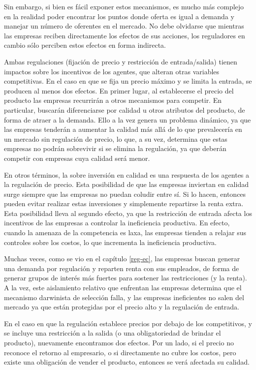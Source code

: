 \documentclass[
  12pt,
  spanish,
]{book}
\begin{document}
Sin embargo, si bien es fácil exponer estos mecanismos, es mucho más complejo en la realidad poder encontrar los puntos donde oferta es igual a demanda y manejar un número de oferentes en el mercado. No debe olvidarse que mientras las empresas reciben directamente los efectos de sus acciones, los reguladores en cambio sólo perciben estos efectos en forma indirecta.

Ambas regulaciones (fijación de precio y restricción de entrada/salida) tienen impactos sobre los incentivos de los agentes, que alteran otras variables competitivas. En el caso en que se fija un precio máximo y se limita la entrada, se producen al menos dos efectos. En primer lugar, al establecerse el precio del producto las empresas recurrirán a otros mecanismos para competir. En particular, buscarán diferenciarse por calidad u otros atributos del producto, de forma de atraer a la demanda. Ello a la vez genera un problema dinámico, ya que las empresas tenderán a aumentar la calidad más allá de lo que prevalecería en un mercado sin regulación de precio, lo que, a su vez, determina que estas empresas no podrán sobrevivir si se elimina la regulación, ya que deberán competir con empresas cuya calidad será menor.

En otros términos, la sobre inversión en calidad es una respuesta de los agentes a la regulación de precio. Esta posibilidad de que las empresas inviertan en calidad surge siempre que las empresas no puedan coludir entre sí. Si lo hacen, entonces pueden evitar realizar estas inversiones y simplemente repartirse la renta extra. Esta posibilidad lleva al segundo efecto, ya que la restricción de entrada afecta los incentivos de las empresas a controlar la ineficiencia productiva. En efecto, cuando la amenaza de la competencia es laxa, las empresas tienden a relajar sus controles sobre los costos, lo que incrementa la ineficiencia productiva.

Muchas veces, como se vio en el capítulo \ref{reg-ec}, las empresas buscan generar una demanda por regulación y reparten renta con sus empleados, de forma de generar grupos de interés más fuertes para sostener las restricciones (y la renta). A la vez, este aislamiento relativo que enfrentan las empresas determina que el mecanismo darwinista de selección falla, y las empresas ineficientes no salen del mercado ya que están protegidas por el precio alto y la regulación de entrada.

En el caso en que la regulación establece precios por debajo de los competitivos, y se incluye una restricción a la salida (o una obligatoriedad de brindar el producto), nuevamente encontramos dos efectos. Por un lado, si el precio no reconoce el retorno al empresario, o si directamente no cubre los costos, pero existe una obligación de vender el producto, entonces se verá afectada su calidad.
\end{document}
